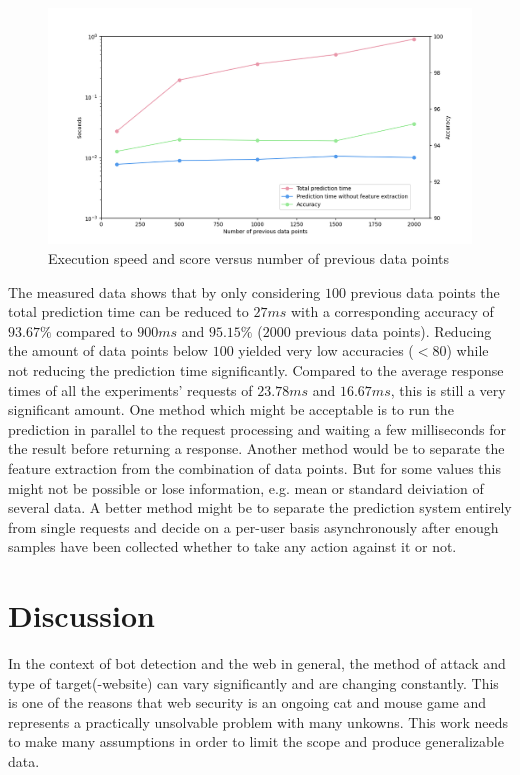 \documentclass[
    fontsize=12pt,
    headings=small,
    parskip=half,           %
    bibliography=totoc,
    numbers=noenddot,       %
    open=any,               %
    final,                   %
    table
]{scrreprt}
\begin{document}
\begin{figure}[h]
    \includegraphics[width=\textwidth]{figures/speed_per_dp_count.png}
    \caption{Execution speed and score versus number of previous data points}
    \label{fig:speed_per_dp_count}
\end{figure}

The measured data shows that by only considering $100$ previous data points the total prediction time can be reduced to $27ms$ with a corresponding accuracy of $93.67\%$ compared to $900ms$ and $95.15\%$ ($2000$ previous data points). Reducing the amount of data points below $100$ yielded very low accuracies ($<80$) while not reducing the prediction time significantly. Compared to the average response times of all the experiments' requests of $23.78ms$ and $16.67ms$, this is still a very significant amount. One method which might be acceptable is to run the prediction in parallel to the request processing and waiting a few milliseconds for the result before returning a response. Another method would be to separate the feature extraction from the combination of data points. But for some values this might not be possible or lose information, e.g. mean or standard deiviation of several data.
A better method might be to separate the prediction system entirely from single requests and decide on a per-user basis asynchronously after enough samples have been collected whether to take any action against it or not.




\chapter{Discussion}
In the context of bot detection and the web in general, the method of attack and type of target(-website) can vary significantly and are changing constantly. This is one of the reasons that web security is an ongoing cat and mouse game and represents a practically unsolvable problem with many unkowns. This work needs to make many assumptions in order to limit the scope and produce generalizable data.
\end{document}
